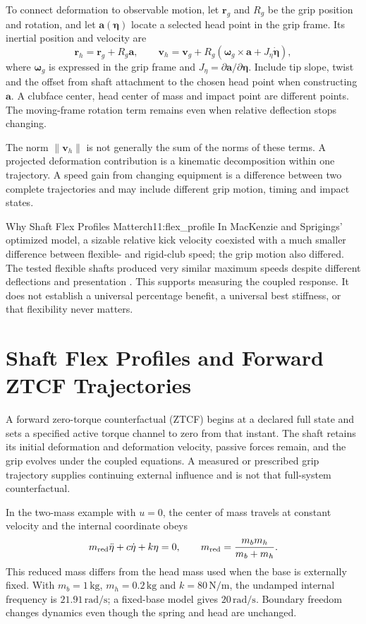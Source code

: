 To connect deformation to observable motion, let $\mathbf r_g$ and $R_g$ be the grip position and rotation, and let $\mathbf a(\boldsymbol\eta)$ locate a selected head point in the grip frame. Its inertial position and velocity are
\[
\mathbf r_h=\mathbf r_g+R_g\mathbf a,\qquad
\mathbf v_h=\mathbf v_g+R_g\left(
\boldsymbol\omega_g\mathbin\times\mathbf a+
J_\eta\dot{\boldsymbol\eta}\right),
\]
where $\boldsymbol\omega_g$ is expressed in the grip frame and $J_\eta=\partial\mathbf a/\partial\boldsymbol\eta$. Include tip slope, twist and the offset from shaft attachment to the chosen head point when constructing $\mathbf a$. A clubface center, head center of mass and impact point are different points. The moving-frame rotation term remains even when relative deflection stops changing.

The norm $\|\mathbf v_h\|$ is not generally the sum of the norms of these terms. A projected deformation contribution is a kinematic decomposition within one trajectory. A speed gain from changing equipment is a difference between two complete trajectories and may include different grip motion, timing and impact states.

\begin{laymansbox}{Why Shaft Flex Profiles Matter}{ch11:flex_profile}
In MacKenzie and Sprigings' optimized model, a sizable relative kick velocity coexisted with a much smaller difference between flexible- and rigid-club speed; the grip motion also differed. The tested flexible shafts produced very similar maximum speeds despite different deflections and presentation \citep{MacKenzie2009Stiffness}. This supports measuring the coupled response. It does not establish a universal percentage benefit, a universal best stiffness, or that flexibility never matters.
\end{laymansbox}

\section{Shaft Flex Profiles and Forward ZTCF Trajectories}
A forward zero-torque counterfactual (ZTCF) begins at a declared full state and sets a specified active torque channel to zero from that instant. The shaft retains its initial deformation and deformation velocity, passive forces remain, and the grip evolves under the coupled equations. A measured or prescribed grip trajectory supplies continuing external influence and is not that full-system counterfactual.

In the two-mass example with $u=0$, the center of mass travels at constant velocity and the internal coordinate obeys
\[
m_{\rm red}\ddot\eta+c\dot\eta+k\eta=0,
\qquad m_{\rm red}=\frac{m_bm_h}{m_b+m_h}.
\]
This reduced mass differs from the head mass used when the base is externally fixed. With $m_b=1\,\mathrm{kg}$, $m_h=0.2\,\mathrm{kg}$ and $k=80\,\mathrm{N/m}$, the undamped internal frequency is $21.91\,\mathrm{rad/s}$; a fixed-base model gives $20\,\mathrm{rad/s}$. Boundary freedom changes dynamics even though the spring and head are unchanged.


